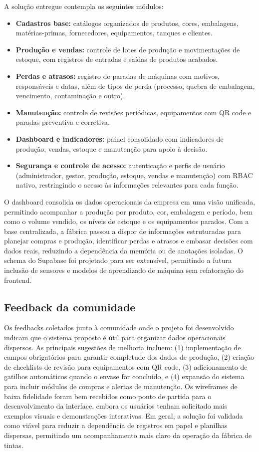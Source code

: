 \documentclass[12pt,a4paper]{article}
\begin{document}
A solução entregue contempla os seguintes módulos:
\begin{itemize}
\item \textbf{Cadastros base:} catálogos organizados de produtos, cores, embalagens, matérias-primas, fornecedores, equipamentos, tanques e clientes.
\item \textbf{Produção e vendas:} controle de lotes de produção e movimentações de estoque, com registros de entradas e saídas de produtos acabados.
\item \textbf{Perdas e atrasos:} registro de paradas de máquinas com motivos, responsáveis e datas, além de tipos de perda (processo, quebra de embalagem, vencimento, contaminação e outro).
\item \textbf{Manutenção:} controle de revisões periódicas, equipamentos com QR code e paradas preventiva e corretiva.
\item \textbf{Dashboard e indicadores:} painel consolidado com indicadores de produção, vendas, estoque e manutenção para apoio à decisão.
\item \textbf{Segurança e controle de acesso:} autenticação e perfis de usuário (administrador, gestor, produção, estoque, vendas e manutenção) com RBAC nativo, restringindo o acesso às informações relevantes para cada função.
\end{itemize}

O dashboard consolida os dados operacionais da empresa em uma visão unificada, permitindo acompanhar a produção por produto, cor, embalagem e período, bem como o volume vendido, os níveis de estoque e os equipamentos parados. Com a base centralizada, a fábrica passou a dispor de informações estruturadas para planejar compras e produção, identificar perdas e atrasos e embasar decisões com dados reais, reduzindo a dependência da memória ou de anotações isoladas. O schema do Supabase foi projetado para ser extensível, permitindo a futura inclusão de sensores e modelos de aprendizado de máquina sem refatoração do frontend.

\subsection{Feedback da comunidade}
Os feedbacks coletados junto à comunidade onde o projeto foi desenvolvido indicam que o sistema proposto é útil para organizar dados operacionais dispersos. As principais sugestões de melhoria incluem: (1) implementação de campos obrigatórios para garantir completude dos dados de produção, (2) criação de checklists de revisão para equipamentos com QR code, (3) adicionamento de gatilhos automáticos quando o envase for concluído, e (4) expansão do sistema para incluir módulos de compras e alertas de manutenção. Os wireframes de baixa fidelidade foram bem recebidos como ponto de partida para o desenvolvimento da interface, embora os usuários tenham solicitado mais exemplos visuais e demonstrações interativas. Em geral, a solução foi validada como viável para reduzir a dependência de registros em papel e planilhas dispersas, permitindo um acompanhamento mais claro da operação da fábrica de tintas.
\end{document}
